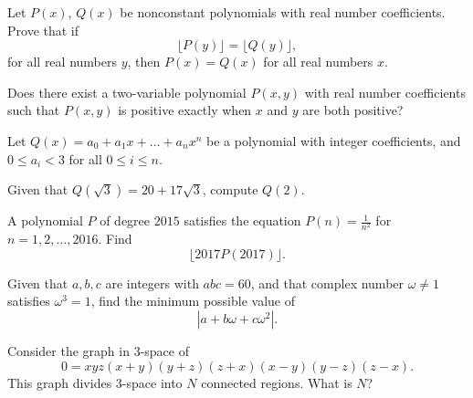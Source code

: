 \documentclass[11pt]{article}
\theoremstyle{definition}
\begin{document}
\begin{question}[name={2017 HMMT, Team, \href{https://artofproblemsolving.com/community/c129h1385981p7707893}{Problem 1}}]
	Let $P(x)$, $Q(x)$ be nonconstant polynomials with real number coefficients. Prove that if
	\[\lfloor P(y) \rfloor = \lfloor Q(y) \rfloor,\]for all real numbers $y$, then $P(x) = Q(x)$ for all real numbers $x$.
\end{question}




\begin{question}[name={2017 HMMT, Team, \href{https://artofproblemsolving.com/community/c129h1385982p7707894}{Problem 2}}]
	Does there exist a two-variable polynomial $P(x, y)$ with real number coefficients such that $P(x, y)$ is positive exactly when $x$ and $y$ are both positive?	
	
\end{question}




\begin{question}[name={2017 HMMT, Algebra \& Number Theory, \href{https://artofproblemsolving.com/community/c129h1386253p7710407}{Problem 1}}]
	Let $Q(x)=a_0+a_1x+\dots+a_nx^n$ be a polynomial with integer coefficients, and $0\le a_i<3$ for all $0\le i\le n$.
	
	Given that $Q(\sqrt{3})=20+17\sqrt{3}$, compute $Q(2)$.
\end{question}




\begin{question}[name={2017 HMMT, Algebra \& Number Theory, \href{https://artofproblemsolving.com/community/c129h1386261p7710445}{Problem 6}}]
	A polynomial $P$ of degree $2015$ satisfies the equation $P(n)=\frac{1}{n^2}$ for $n=1, 2, \dots, 2016$. Find $$\lfloor 2017P(2017)\rfloor.$$
\end{question}





\begin{question}[name={2017 HMMT, November General, \href{https://artofproblemsolving.com/community/c129h1639900p10329176}{Problem 5}}]
	Given that $a,b,c$ are integers with $abc = 60$, and that complex number $\omega \neq 1$ satisfies $\omega^3=1$, find the minimum possible value of $$|a + b\omega + c\omega^2|.$$
\end{question}




\begin{question}[name={2017 HMMT, November Guts, \href{https://artofproblemsolving.com/community/c129h1387204p7718331}{Problem 11}}]
	Consider the graph in $3$-space of
	\[0 = xyz(x + y)(y + z)(z + x)(x - y)(y - z)(z - x).\]This graph divides $3$-space into $N$ connected regions. What is $N$?
\end{question}
\end{document}
